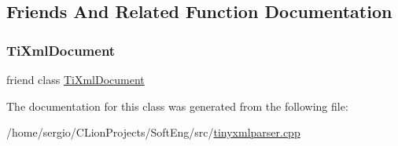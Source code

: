 \subsection{Friends And Related Function Documentation}
\mbox{\label{class_ti_xml_parsing_data_a173617f6dfe902cf484ce5552b950475}} 
\subsubsection{\texorpdfstring{Ti\+Xml\+Document}{TiXmlDocument}}
{\footnotesize\ttfamily friend class \hyperlink{class_ti_xml_document}{Ti\+Xml\+Document}\hspace{0.3cm}{\ttfamily [friend]}}



The documentation for this class was generated from the following file\+:\begin{DoxyCompactItemize}
\item 
/home/sergio/\+C\+Lion\+Projects/\+Soft\+Eng/src/\hyperlink{tinyxmlparser_8cpp}{tinyxmlparser.\+cpp}\end{DoxyCompactItemize}
